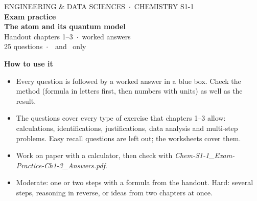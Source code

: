\documentclass[11pt]{article}
\newcommand{\moderate}{\tcbox[on line, colback=BurntOrange!15, colframe=BurntOrange, boxrule=0.4pt,
  arc=0.8mm, left=1pt, right=1pt, top=0pt, bottom=0pt, fontupper=\sffamily\scriptsize]{Moderate}}
\newcommand{\hard}{\tcbox[on line, colback=Maroon!12, colframe=Maroon, boxrule=0.4pt, arc=0.8mm,
  left=1pt, right=1pt, top=0pt, bottom=0pt, fontupper=\sffamily\scriptsize]{Hard \,$\bigstar$}}
\begin{document}
\thispagestyle{empty}
\vspace*{8mm}
\begin{center}
  {\sffamily\small ENGINEERING \& DATA SCIENCES \,$\cdot$\, CHEMISTRY S1-1}\\[8pt]
  {\sffamily\bfseries\Huge\color{heading} Exam practice}\\[4pt]
  {\sffamily\bfseries\LARGE\color{heading} The atom and its quantum model}\\[8pt]
  {\sffamily\Large Handout chapters 1--3 \ifkey\,$\cdot$\, worked answers\fi}\\[4pt]
  {\normalsize 25 questions \,$\cdot$\, \moderate\ and \hard\ only}
\end{center}
\vspace{5mm}
{\sffamily\bfseries\color{heading} How to use it}
\begin{itemize}[leftmargin=7mm, itemsep=2pt]
\ifkey
  \item Every question is followed by a worked answer in a \textcolor{keyblue}{blue box}. Check the
        method (formula in letters first, then numbers with units) as well as the result.
\else
  \item The questions cover every type of exercise that chapters 1--3 allow: calculations,
        identifications, justifications, data analysis and multi-step problems. Easy recall
        questions are left out; the worksheets cover them.
  \item Work on paper with a calculator, then check with
        \emph{Chem-S1-1\_Exam-Practice-Ch1-3\_Answers.pdf}.
\fi
  \item Moderate: one or two steps with a formula from the handout. Hard: several steps,
        reasoning in reverse, or ideas from two chapters at once.
\end{itemize}

\end{document}
